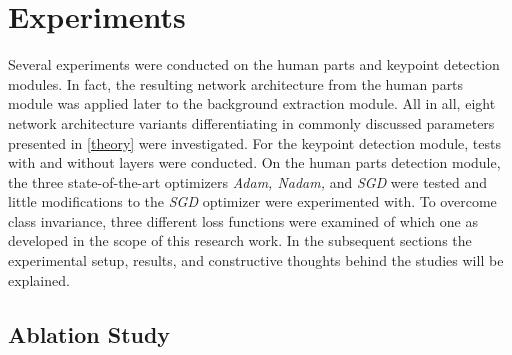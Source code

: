 

\chapter{Experiments} %

\label{experiments} %
Several experiments were conducted on the human parts and keypoint detection modules.
In fact, the resulting network architecture from the human parts module was applied later to the background extraction module.
All in all, eight network architecture variants differentiating in commonly discussed parameters presented in \autoref{theory}
were investigated.
For the keypoint detection module, tests with and without  layers were conducted.
On the human parts detection module, the three state-of-the-art optimizers \textit{Adam, Nadam,} and \textit{SGD} were tested and little
modifications to the \textit{SGD} optimizer were experimented with.
To overcome class invariance, three different loss functions were examined of which one as developed in the scope of this research work.
In the subsequent sections the experimental setup, results, and constructive thoughts behind the studies will be explained.



\section{Ablation Study}




